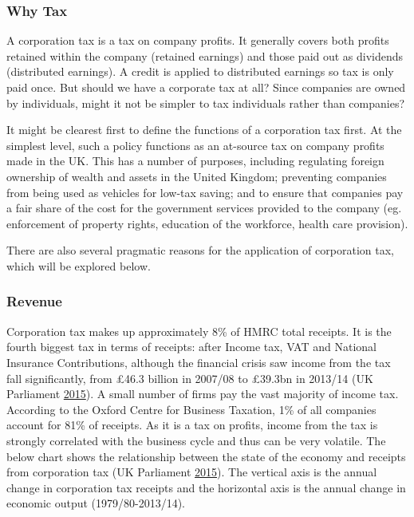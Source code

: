 \documentclass[]{tufte-handout}
\begin{document}
\hypertarget{why-tax-1}{%
\subsubsection{Why Tax}\label{why-tax-1}}

A corporation tax is a tax on company profits. It generally covers both
profits retained within the company (retained earnings) and those paid
out as dividends (distributed earnings). A credit is applied to
distributed earnings so tax is only paid once. But should we have a
corporate tax at all? Since companies are owned by individuals, might it
not be simpler to tax individuals rather than companies?

It might be clearest first to define the functions of a corporation tax
first. At the simplest level, such a policy functions as an at-source
tax on company profits made in the UK. This has a number of purposes,
including regulating foreign ownership of wealth and assets in the
United Kingdom; preventing companies from being used as vehicles for
low-tax saving; and to ensure that companies pay a fair share of the
cost for the government services provided to the company (eg.
enforcement of property rights, education of the workforce, health care
provision).

There are also several pragmatic reasons for the application of
corporation tax, which will be explored below.

\hypertarget{revenue}{%
\subsubsection{Revenue}\label{revenue}}

Corporation tax makes up approximately 8\% of HMRC total receipts. It is
the fourth biggest tax in terms of receipts: after Income tax, VAT and
National Insurance Contributions, although the financial crisis saw
income from the tax fall significantly, from £46.3 billion in 2007/08 to
£39.3bn in 2013/14 (UK Parliament
\protect\hyperlink{ref-UKParliament2015}{2015}). A small number of firms
pay the vast majority of income tax. According to the Oxford Centre for
Business Taxation, 1\% of all companies account for 81\% of receipts. As
it is a tax on profits, income from the tax is strongly correlated with
the business cycle and thus can be very volatile. The below chart shows
the relationship between the state of the economy and receipts from
corporation tax (UK Parliament
\protect\hyperlink{ref-UKParliament2015}{2015}). The vertical axis is
the annual change in corporation tax receipts and the horizontal axis is
the annual change in economic output (1979/80-2013/14).
\end{document}
